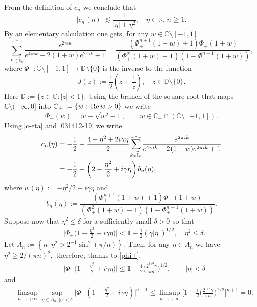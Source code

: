 \documentclass[EJP]{ejpecp} %
\newcommand\R{{\mathbb R}}
\newcommand\T{{\mathbb I}}
\newcommand \ga{\gamma}
\renewcommand{\ge}{\geqslant}
\renewcommand{\le}{\leqslant}
\renewcommand{\hat}{\widehat}
\numberwithin{equation}{section}
\begin{document}
\label{sec:app6}

From the definition of $c_n$ we conclude that
\begin{equation}
\label{022312-19}
|c_n(\eta)|\lesssim \frac{1}{|\eta|+\eta^2},\quad \eta\in\R,\,n\ge1.
\end{equation}
By an elementary calculation one gets, for any $w\in \mathbb{C}\setminus[-1,1]$
\begin{equation}
\label{031412-19}
\underset{{k\in \widehat{\T}_n}}{{\hat\sum}}\frac{e^{2\pi i
    k}}{e^{4\pi i
    k}-2(1+w) e^{2\pi i
    k}+1}=\frac{(\Phi ^{n+1}_+(1+w)+1) \Phi _+(1+w)}{(\Phi
  ^2_+(1+w)-1)(1-\Phi ^{n+1}_+(1+w))},
\end{equation}
where
$\Phi_+:  \mathbb{C}\setminus[-1,1]\to \mathbb D\setminus\{0\}$ is the inverse to
the function
$$
J(z):=\frac{1}{2}\left(z+\frac{1}{z}\right) ,\quad z\in \mathbb D\setminus\{0\}.
$$
Here $\mathbb D:=\{z\in\mathbb{C}:|z|<1\}$.
Using the branch of the square root that maps $\mathbb{C}\setminus(-\infty,0]$
into $\mathbb{C}_+:=\{w:\,{\rm Re}\,w>0\}$ we  write
\begin{equation}
\label{phi+}
\Phi_+(w)=w-\sqrt{w^2-1},\qquad w\in \mathbb{C}_+\cap (\mathbb{C}\setminus[-1,1]).
\end{equation}
Using  \eqref{c-eta}  and \eqref{031412-19}
we
 write
\begin{align}
\label{c-eta1}
c_n(\eta)&=-\frac12-\frac{4-\eta^2+2i\ga \eta}{2}\underset{{k\in \widehat{\T}_n}}{{\hat\sum}}\frac{e^{2\pi ik}}{e^{4\pi i k}-2(1+w)e^{2\pi ik}+1}\notag\\
&
=-\frac12-\left(2-\frac{\eta^2}{2}+i\ga \eta\right)b_n(\eta),
\end{align}
where
$w(\eta):=-\eta^2/2+i\ga\eta$
and
$$
b_n(\eta):=\frac{(\Phi ^{n+1}_+(1+w)+1) \Phi _+(1+w)}{(\Phi ^2_+(1+w)-1)(1-\Phi ^{n+1}_+(1+w))}.
$$
Suppose now that $\eta^2\le \delta$ for a sufficiently small
$\delta>0$ so that
\begin{align*}
&\Big|\Phi_+\Big(1-\frac{\eta^2}{2}+i\ga\eta
  \Big)\Big|<1-\frac{1}{2}(\ga|\eta|)^{1/2},\quad \eta^2\le \delta.
\end{align*}
Let 
$
A_n:=\left\{\eta:\,\eta^2>2^{-1}\sin^2(\pi/n)\right\}.
$
 Then, for any $\eta\in A_n$ we have
$
\eta^2\ge 2/(\pi n)^2,
$
therefore, thanks to \eqref{phi+},
\begin{align*}
&\Big|\Phi_+\Big(1-\frac{\eta^2}{2}+i\ga\eta
  \Big)\Big|\le 1-\frac{1}{2}\Big(\frac{2^{1/2}\ga}{\pi n}\Big)^{1/2},\qquad |\eta|<\delta
\end{align*}
and
\begin{align*}
&\limsup_{n\to+\infty}\sup_{\eta\in A_n,|\eta|<\delta}\Big|\Phi_+\left(1-\frac{\eta^2}{2}+i\ga\eta
  \right)\Big|^{n+1}\le \limsup_{n\to+\infty}\bigg[1-\frac{1}{2}\Big(\frac{2^{1/2}\ga}{\pi
  n}\Big)^{1/2}\bigg]^{n+1}=0.
\end{align*}
\end{document}
